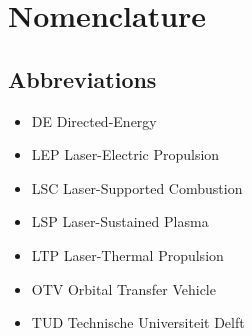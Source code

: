 \chapter*{Nomenclature}
\setlength{\columnsep}{1cm}
\newenvironment{nomtable}
    {
        \centering
        \tabularx{\columnwidth}{r>{\raggedright\arraybackslash}X}
    }
    {
        \endtabularx
    }
\newenvironment{nomlist}
    {
        \begin{itemize}[leftmargin=1.5cm]
            \raggedright
            \setlength{\parsep}{0pt}
            \setlength{\itemsep}{-4pt}
    }
    {
        \end{itemize}
    }
\begin{multicols*}{2}
    \section*{Abbreviations}

    \begin{nomlist}
        \item[DE]               Directed-Energy 
        \item[LEP]              Laser-Electric Propulsion
        \item[LSC]              Laser-Supported Combustion
        \item[LSP]              Laser-Sustained Plasma
        \item[LTP]              Laser-Thermal Propulsion
        \item[OTV]              Orbital Transfer Vehicle 
        \item[TUD]              Technische Universiteit Delft
    \end{nomlist}


\end{multicols*}
